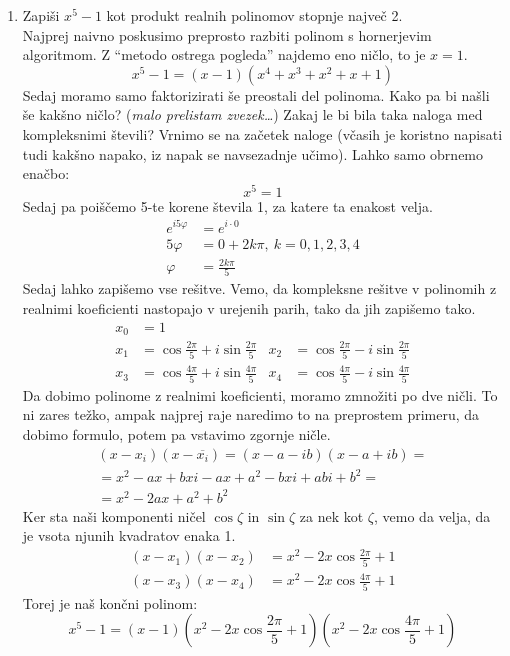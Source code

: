 \documentclass[12pt,a4paper,slovene]{article}
\begin{document}
\begin{enumerate}[(1)]
    \item Zapiši $x^5 - 1$ kot produkt realnih polinomov stopnje največ 2.\\
    Najprej naivno poskusimo preprosto razbiti polinom s hornerjevim algoritmom. Z ``metodo ostrega pogleda'' najdemo eno ničlo, to je $x = 1$.
    \[
    x^5 - 1 = (x - 1)(x^4 + x^3 + x^2 + x + 1)
    \]
    Sedaj moramo samo faktorizirati še preostali del polinoma. Kako pa bi našli še kakšno ničlo? (\emph{malo prelistam zvezek\ldots})
    Zakaj le bi bila taka naloga med kompleksnimi števili? Vrnimo se na začetek naloge (včasih je koristno napisati tudi kakšno napako, iz napak se navsezadnje učimo). Lahko samo obrnemo enačbo:
    \[
    x^5 = 1
    \]
    Sedaj pa poiščemo 5-te korene števila 1, za katere ta enakost velja.
    \begin{align*}
    e^{i 5 \varphi} &= e^{i \cdot 0}\\
    5\varphi &= 0 + 2k\pi,\ k = 0, 1, 2, 3, 4\\
    \varphi &= \frac{2k\pi}{5}
    \end{align*}
    Sedaj lahko zapišemo vse rešitve. Vemo, da kompleksne rešitve v polinomih z realnimi koeficienti nastopajo v urejenih parih, tako da jih zapišemo tako.
    \begin{align*}
    x_0 &= 1 &\\
    x_1 &= \cos \frac{2\pi}{5} + i \sin \frac{2\pi}{5} &
    x_2 &= \cos \frac{2\pi}{5} - i \sin \frac{2\pi}{5} \\
    x_3 &= \cos \frac{4\pi}{5} + i \sin \frac{4\pi}{5} &
    x_4 &= \cos \frac{4\pi}{5} - i \sin \frac{4\pi}{5}
    \end{align*}
    Da dobimo polinome z realnimi koeficienti, moramo zmnožiti po dve ničli. To ni zares težko, ampak najprej raje naredimo to na preprostem primeru, da dobimo formulo, potem pa vstavimo zgornje ničle.
    \begin{multline*}
        (x - x_i) (x - \overline{x_i}) = (x - a - ib) (x - a + ib) =\\
        = x^2 - ax + bxi - ax + a^2 - bxi + abi + b^2 =\\
        = x^2 - 2ax + a^2 + b^2 
    \end{multline*}
    Ker sta naši komponenti ničel $\cos \zeta$ in $\sin \zeta$ za nek kot $\zeta$, vemo da velja, da je vsota njunih kvadratov enaka 1.
    \begin{align*}
    (x - x_1) (x - x_2) &= x^2 - 2 x \cos \frac{2\pi}{5} + 1\\
    (x- x_3)(x - x_4) &= x^2 - 2 x \cos \frac{4\pi}{5} + 1
    \end{align*}
    Torej je naš končni polinom:
    \[
    x^5 - 1 = \left(x - 1\right)\left( x^2 - 2x \cos \frac{2\pi}{5} + 1\right) \left(x^2 - 2x \cos \frac{4\pi}{5} + 1\right)
    \]
    

\end{enumerate}
\end{document}
